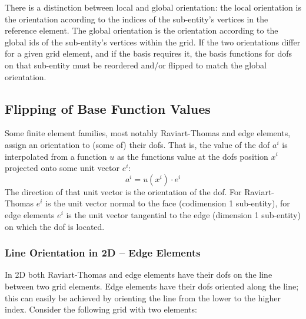 \documentclass[a4paper,11pt]{article}
\begin{document}
There is a distinction between local and global orientation: the local
orientation is the orientation according to the indices of the sub-entity's
vertices in the reference element.  The global orientation is the orientation
according to the global ids of the sub-entity's vertices within the grid.  If
the two orientations differ for a given grid element, and if the basis
requires it, the basis functions for dofs on that sub-entity must be reordered
and/or flipped to match the global orientation.

\subsection{Flipping of Base Function Values}

Some finite element families, most notably Raviart-Thomas and edge elements,
assign an orientation to (some of) their dofs.  That is, the value of the dof
$a^i$ is interpolated from a function $u$ as the functions value at the dofs
position $x^i$ projected onto some unit vector $e^i$:
\begin{equation}
  a^i = u(x^i)\cdot e^i
\end{equation}
The direction of that unit vector is the orientation of the dof.  For
Raviart-Thomas $e^i$ is the unit vector normal to the face (codimension 1
sub-entity), for edge elements $e^i$ is the unit vector tangential to the edge
(dimension 1 sub-entity) on which the dof is located.

\subsubsection{Line Orientation in 2D -- Edge Elements}

In 2D both Raviart-Thomas and edge elements have their dofs on the line
between two grid elements.  Edge elements have their dofs oriented along the
line; this can easily be achieved by orienting the line from the lower to the
higher index.  Consider the following grid with two elements:
\end{document}
